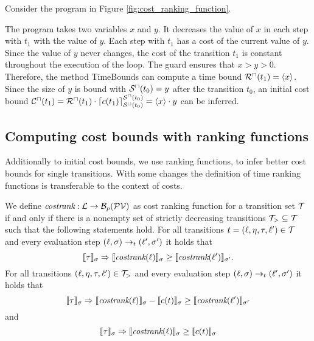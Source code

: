 \begin{example}
  Consider the program in Figure \ref{fig:cost_ranking_function}.
  
  The program takes two variables $x$ and $y$.
  It decreases the value of $x$ in each step with $t_1$ with the value of $y$.
  Each step with $t_1$ has a cost of the current value of $y$.
  Since the value of $y$ never changes, the cost of the transition $t_1$ is constant throughout the execution of the loop.
  The guard ensures that $x > y > 0$.
  Therefore, the method TimeBounds can compute a time bound ${\mathcal{R}^\sqcap}(t_1) = \langle x\rangle$.
  Since the size of $y$ is bound with ${\mathcal{S}^\sqcap}(t_0) = y$ after the transition $t_0$, an initial cost bound ${\mathcal{C}^\sqcap}(t_1) = {\mathcal{R}^\sqcap}(t_1) \cdot \lceil c(t_1) \rceil^{{\mathcal{S}^\sqcap}(t_0)}_{{\mathcal{S}^\sqcup}(t_0)} = \langle x\rangle \cdot y$ can be inferred.
\end{example}

\subsection{Computing cost bounds with ranking functions}

Additionally to initial cost bounds, we use ranking functions, to infer better cost bounds for single transitions.
With some changes the definition of time ranking functions is transferable to the context of costs.

\begin{definition} 
  We define $\emph{costrank}: \mathcal{L} \rightarrow \mathcal{B}_p(\mathcal{PV})$ as cost ranking function for a transition set $\mathcal{T}$ if and only if there is a nonempty set of strictly decreasing transitions $\mathcal{T}_{>} \subseteq \mathcal{T}$ such that the following statements hold.
  For all transitions $t = (\ell, \eta, \tau, \ell') \in \mathcal{T}$ and every evaluation step $(\ell, \sigma) \rightarrow_t (\ell', \sigma')$ it holds that
  \[ \llbracket \tau \rrbracket_{\sigma} \Rightarrow \llbracket \emph{costrank}(\ell) \rrbracket_{\sigma} \geq \llbracket \emph{costrank}(\ell') \rrbracket_{\sigma'}. \]
  For all transitions $(\ell, \eta, \tau, \ell') \in \mathcal{T}_{>}$ and every evaluation step $(\ell, \sigma) \rightarrow_t (\ell', \sigma')$ it holds that        
  \[ \llbracket \tau \rrbracket_{\sigma} \Rightarrow \llbracket \emph{costrank}(\ell) \rrbracket_{\sigma} - \llbracket c(t) \rrbracket_{\sigma} \geq \llbracket \emph{costrank}(\ell') \rrbracket_{\sigma'} \]
  and
  \[ \llbracket \tau \rrbracket_{\sigma} \Rightarrow \llbracket \emph{costrank}(\ell) \rrbracket_{\sigma} \geq \llbracket c(t) \rrbracket_{\sigma} \]
\end{definition}

